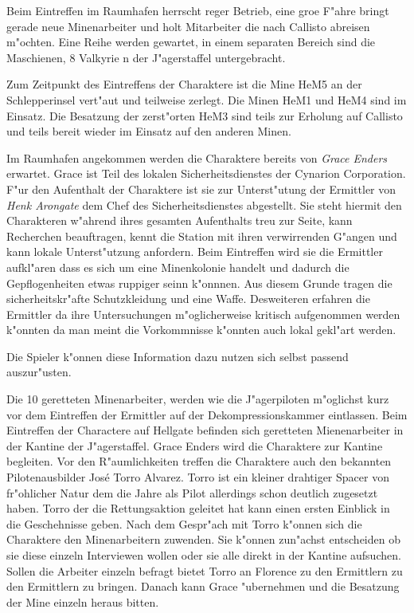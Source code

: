 Beim Eintreffen im Raumhafen herrscht reger Betrieb, eine gro\3e F"ahre bringt gerade neue Minenarbeiter und holt Mitarbeiter die nach Callisto abreisen m"ochten. Eine Reihe werden gewartet, in einem separaten Bereich sind die Maschienen, 8 Valkyrie n der J"agerstaffel untergebracht. 

Zum Zeitpunkt des Eintreffens der Charaktere ist die Mine HeM5 an der Schlepperinsel vert"aut und teilweise zerlegt. Die Minen HeM1 und HeM4 sind im Einsatz. Die Besatzung der zerst"orten HeM3 sind teils zur Erholung auf Callisto und teils bereit wieder im Einsatz auf den anderen Minen.

Im Raumhafen angekommen werden die Charaktere bereits von \emph{Grace Enders} erwartet. Grace ist Teil  des lokalen Sicherheitsdienstes der Cynarion Corporation. F"ur den Aufenthalt der Charaktere ist sie zur Unterst"utung der Ermittler von \emph{Henk Arongate} dem Chef des Sicherheitsdienstes abgestellt. Sie steht hiermit den Charakteren w"ahrend ihres gesamten Aufenthalts treu zur Seite, kann Recherchen beauftragen, kennt die Station mit ihren verwirrenden G"angen und kann lokale Unterst"utzung anfordern. Beim Eintreffen wird sie die Ermittler aufkl"aren dass es sich um eine Minenkolonie handelt und dadurch die Gepflogenheiten etwas ruppiger seinn k"onnnen. Aus diesem Grunde tragen die sicherheitskr"afte Schutzkleidung und eine Waffe. Desweiteren erfahren die Ermittler da\3 ihre Untersuchungen m"oglicherweise kritisch aufgenommen werden k"onnten da man meint die Vorkommnisse k"onnten auch lokal gekl"art werden.

\begin{remarks}
	Die Spieler k"onnen diese Information dazu nutzen sich selbst passend auszur"usten.
\end{remarks}


Die 10 geretteten Minenarbeiter, werden wie die J"agerpiloten m"oglichst kurz vor dem Eintreffen der Ermittler auf der Dekompressionskammer eintlassen. Beim Eintreffen der Charactere auf Hellgate befinden sich geretteten Mienenarbeiter in der Kantine der J"agerstaffel. Grace Enders wird die Charaktere zur Kantine begleiten. Vor den R"aumlichkeiten treffen die Charaktere auch den bekannten Pilotenausbilder Jos\'{e} \frqq{}Torro\flqq{} Alvarez. Torro ist ein kleiner drahtiger Spacer von fr"ohlicher Natur dem die Jahre als Pilot allerdings schon deutlich zugesetzt haben. Torro der die Rettungsaktion geleitet hat kann einen ersten Einblick in die Geschehnisse geben. Nach dem Gespr"ach mit Torro k"onnen sich die Charaktere den Minenarbeitern zuwenden. Sie k"onnen zun"achst entscheiden ob sie diese einzeln Interviewen wollen oder sie alle direkt in der Kantine aufsuchen. Sollen die Arbeiter einzeln befragt bietet Torro an Florence zu den Ermittlern zu den Ermittlern zu bringen. Danach kann Grace "ubernehmen und die Besatzung der Mine einzeln heraus bitten.

